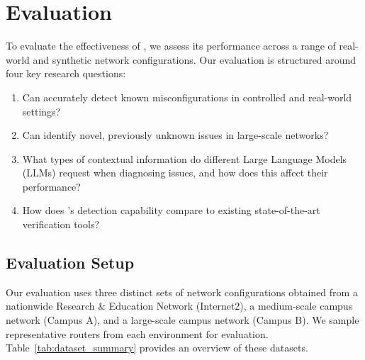 \section{Evaluation}
\label{sec:eval}
To evaluate the effectiveness of \sysname{}, we assess its performance across a range of real-world and synthetic network configurations. Our evaluation is structured around four key research questions:

\begin{enumerate}
    \item Can \sysname{} accurately detect known misconfigurations in controlled and real-world settings?
    \item Can \sysname{} identify novel, previously unknown issues in large-scale networks?
    \item What types of contextual information do different Large Language Models (LLMs) request when diagnosing issues, and how does this affect their performance?
    \item How does \sysname{}'s detection capability compare to existing state-of-the-art verification tools?
\end{enumerate}


\subsection{Evaluation Setup}

Our evaluation uses three distinct sets of network configurations obtained from a nationwide Research \& Education Network (Internet2), a medium-scale campus network (Campus A), and a large-scale campus network (Campus B). We sample representative routers from each environment for evaluation. Table~\ref{tab:dataset_summary} provides an overview of these datasets.



